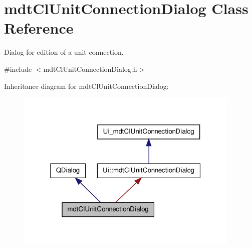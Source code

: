 \hypertarget{classmdt_cl_unit_connection_dialog}{\section{mdt\-Cl\-Unit\-Connection\-Dialog Class Reference}
\label{classmdt_cl_unit_connection_dialog}
}


Dialog for edition of a unit connection.  




{\ttfamily \#include $<$mdt\-Cl\-Unit\-Connection\-Dialog.\-h$>$}



Inheritance diagram for mdt\-Cl\-Unit\-Connection\-Dialog\-:
\nopagebreak
\begin{figure}[H]
\begin{center}
\leavevmode
\includegraphics[width=304pt]{classmdt_cl_unit_connection_dialog__inherit__graph}
\end{center}
\end{figure}


